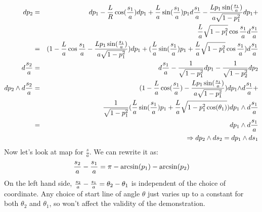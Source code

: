 {\begin{eqnarray}
dp_{2}&=&dp_{1}-\frac{L}{R}\cos(\frac{s_{1}}{a})dp_{1}+\frac{L}{a}\sin(\frac{s_{1}}{a})p_{1}d\frac{s_{1}}{a}-
\frac{Lp_{1}\sin(\frac{s_{1}}{a})}{a\sqrt{1-p_{1}^{2}}}dp_{1}+
\\\nonumber&&\frac{L}{a}\sqrt{1-p_{1}^{2}}\cos{\frac{\ensuremath{s}_{1}}{a}}d\frac{s_{1}}{a}\\\nonumber
&=&(1-\frac{L}{a}\cos{\frac{\ensuremath{s}_{1}}{a}}-\frac{Lp_{1}\sin(\frac{s_{1}}{a})}{a\sqrt{1-p_{1}^{2}}})dp_{1}
+(\frac{L}{a}\sin(\frac{s_{1}}{a})p_{1}+\frac{L}{a}\sqrt{1-p_{1}^{2}}\cos{\frac{\ensuremath{s}_{1}}{a}})d\frac{s_{1}}{a}\\\nonumber
d\frac{s_{2}}{a}&=&d\frac{s_{1}}{a}-\frac{1}{\sqrt{1-p_{1}^{2}}}dp_{1}-\frac{1}{\sqrt{1-p_{2}^{2}}}dp_{2}\\\nonumber
dp_{2}\wedge d\frac{s_{2}}{a}&=& (1-\frac{L}{a}\cos(\frac{s_{1}}{a})-\frac{Lp_{1}\sin(\frac{s_{1}}{a})}{a\sqrt{1-p_{1}^{2}}})dp_{1}{\wedge}d\frac{s_{1}}{a}+\\&&\frac{1}{\sqrt{1-p_{1}^{2}}}(\frac{L}{a}\sin(\frac{s_{1}}{a})p_{1}
+\frac{L}{a}\sqrt{1-p_{1}^{2}\cos(\theta_{1})})dp_{1}\wedge d\frac{s_{1}}{a}\\\nonumber
&=&dp_{1}\wedge d\frac{s_{1}}{a}\\
&&\Rightarrow dp_{2}\wedge ds_{2} = dp_{1}\wedge ds_{1}
\end{eqnarray}
Now let's look at map for $\frac{s}{a}$. We can rewrite it as:
\[
 \frac{s_{2}}{a} - \frac{s_{1}}{a} = \pi-\arcsin(p_{1})-\arcsin(p_{2})
 \]
On the left hand side, $\frac{s_{2}}{a} - \frac{s_{1}}{a} =
\theta_{2}-\theta_{1}$ is independent of the choice of coordinate. Any
choice of start line of angle $\theta$ just varies up to a constant for
both $\theta_{2}$ and $\theta_{1}$, so won't affect the validity of the
demonstration.

}
